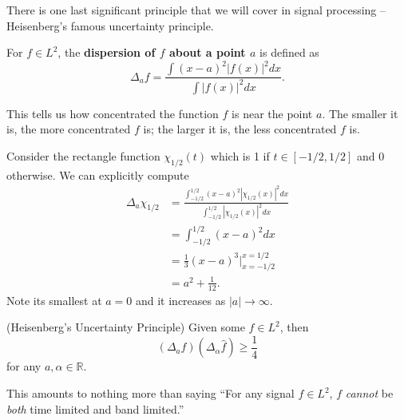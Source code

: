 There is one last significant principle that we will cover in
signal processing -- Heisenberg's famous uncertainty principle.

\begin{defn}
For $f\in L^2$, the \textbf{dispersion of $f$ about a point $a$}
is defined as
\begin{equation}
\Delta_{a}f = \frac{\int(x-a)^2|f(x)|^2dx}{\int|f(x)|^2dx}.
\end{equation}
\end{defn}
This tells us how concentrated the function $f$ is near the point
$a$. The smaller it is, the more concentrated $f$ is; the larger
it is, the less concentrated $f$ is.

\begin{ex}
Consider the rectangle function $\chi_{1/2}(t)$ which is 1 if
$t\in[-1/2,1/2]$ and 0 otherwise. We can explicitly compute
\begin{subequations}
\begin{align}
\Delta_{a}\chi_{1/2} &=
\frac{\int^{1/2}_{-1/2}(x-a)^2|\chi_{1/2}(x)|^2dx}{\int^{1/2}_{-1/2}|\chi_{1/2}(x)|^2dx}\\
&= \int^{1/2}_{-1/2}(x-a)^2dx\\
&= \frac{1}{3}(x-a)^{3}|^{x=1/2}_{x=-1/2}\\
&= a^{2}+\frac{1}{12}.
\end{align}
\end{subequations}
Note its smallest at $a=0$ and it increases as $|a|\to\infty$. 
\end{ex}

\begin{thm}{(Heisenberg's Uncertainty Principle)}
Given some $f\in L^2$, then
\begin{equation}
\left(\Delta_{a}f\right)\left(\Delta_{\alpha}\widehat{f}\right)\geq\frac{1}{4}
\end{equation}
for any $a,\alpha\in\mathbb{R}$.
\end{thm}
This amounts to nothing more than saying ``For any signal $f\in
L^2$, $f$ \emph{cannot} be \emph{both} time limited and band limited.''
